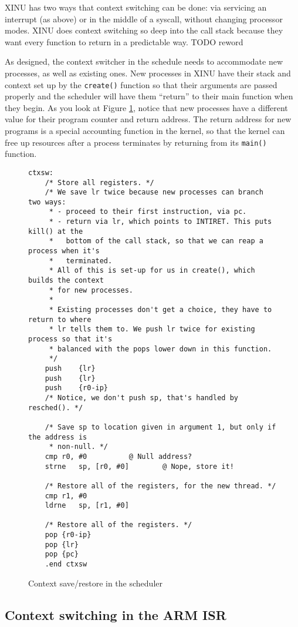 \documentclass[12pt]{article}
\newcommand{\TODO}[1]{{\huge\color{red}TODO \Large #1}}
\newcommand{\code}[1]{{\tt #1}}
\begin{document}
XINU has two ways that context switching can be done: via servicing an
interrupt (as above) or in the middle of a syscall, without changing processor
modes. XINU does context switching so deep into the call stack because they
want every function to return in a predictable way. \TODO{reword}

As designed, the context switcher in the schedule needs to accommodate new
processes, as well as existing ones. New processes in XINU have their stack and
context set up by the \code{create()} function so that their arguments are
passed properly and the scheduler will have them ``return'' to their main
function when they begin. As you look at Figure \ref{ctxsw}, notice that new
processes have a different value for their program counter and return address.
The return address for new programs is a special accounting function in the
kernel, so that the kernel can free up resources after a process terminates by
returning from its \code{main()} function.

\begin{figure}
\caption{Context save/restore in the scheduler}
\label{ctxsw}
\small
\begin{verbatim}
ctxsw:
	/* Store all registers. */
	/* We save lr twice because new processes can branch two ways:
	 * - proceed to their first instruction, via pc.
	 * - return via lr, which points to INTIRET. This puts kill() at the
	 *   bottom of the call stack, so that we can reap a process when it's
	 *   terminated.
	 * All of this is set-up for us in create(), which builds the context
	 * for new processes.
	 *
	 * Existing processes don't get a choice, they have to return to where
	 * lr tells them to. We push lr twice for existing process so that it's
	 * balanced with the pops lower down in this function.
	 */
	push	{lr}
	push	{lr}
	push	{r0-ip}
	/* Notice, we don't push sp, that's handled by resched(). */

	/* Save sp to location given in argument 1, but only if the address is
	 * non-null. */
	cmp	r0, #0			@ Null address?
	strne	sp, [r0, #0]		@ Nope, store it!

	/* Restore all of the registers, for the new thread. */
	cmp	r1, #0
	ldrne	sp, [r1, #0]

	/* Restore all of the registers. */
	pop	{r0-ip}
	pop	{lr}
	pop	{pc}
	.end ctxsw
\end{verbatim}
\end{figure}

\subsection{Context switching in the ARM ISR}
\end{document}
